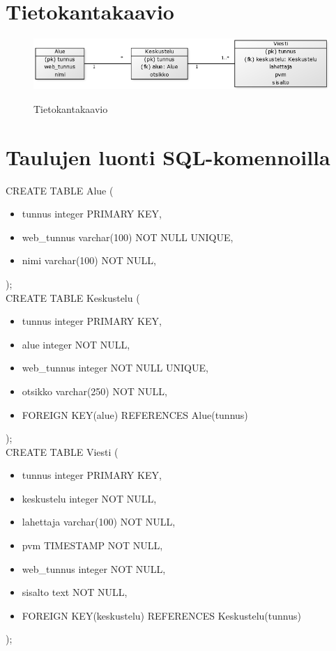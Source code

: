 \documentclass[titlepage]{article}
\begin{document}
\section*{Tietokantakaavio}

\begin{figure}[H]
\includegraphics[width=\textwidth]{tietokantakaavio}
\label{tkkaavio}
\caption{Tietokantakaavio}
\end{figure}

\section*{Taulujen luonti SQL-komennoilla}

CREATE TABLE Alue ( 
\begin{itemize}
	\item[] tunnus integer PRIMARY KEY,
    \item[] web{\_}tunnus varchar(100) NOT NULL UNIQUE,
    \item[] nimi varchar(100) NOT NULL,
\end{itemize}
); \\

\noindent CREATE TABLE Keskustelu ( 
\begin{itemize}
	\item[] tunnus integer PRIMARY KEY,
    \item[] alue integer NOT NULL,
    \item[] web{\_}tunnus integer NOT NULL UNIQUE,
    \item[] otsikko varchar(250) NOT NULL,
    \item[] FOREIGN KEY(alue) REFERENCES Alue(tunnus)

\end{itemize}
); \\

\noindent CREATE TABLE Viesti ( 
\begin{itemize}
	\item[] tunnus integer PRIMARY KEY,
    \item[] keskustelu integer NOT NULL,
    \item[] lahettaja varchar(100) NOT NULL,
    \item[] pvm TIMESTAMP NOT NULL,
    \item[] web{\_}tunnus integer NOT NULL,
    \item[] sisalto text NOT NULL,
    \item[] FOREIGN KEY(keskustelu) REFERENCES Keskustelu(tunnus)


\end{itemize}
); \\
\end{document}
